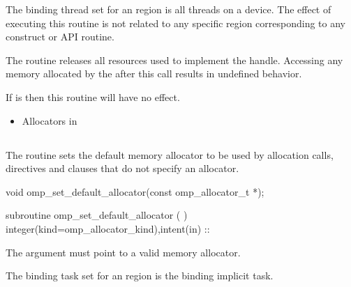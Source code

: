 The binding thread set for an  region is 
all threads on a device. The effect of executing this routine is not 
related to any specific region corresponding to any construct or API routine.

\effect

The  routine releases all resources used 
to implement the  handle. Accessing any memory allocated 
by the  after this call results in undefined behavior.

If  is  then this routine will have no effect.
 
\crossreferences
\begin{itemize}
\item Allocators in 
\end{itemize}



\subsection{}
\label{subsec:omp_set_default_allocator}

\summary
The  routine sets the default memory 
allocator to be used by allocation calls,  directives 
and  clauses that do not specify an allocator.

\format
\begin{ccppspecific}
\begin{ompcFunction}
void omp_set_default_allocator(const omp_allocator_t *);
\end{ompcFunction}
\end{ccppspecific}
\begin{fortranspecific}
\begin{ompfSubroutine}
subroutine omp_set_default_allocator (  )
integer(kind=omp_allocator_kind),intent(in) :: 
\end{ompfSubroutine}
\end{fortranspecific}

\constraints
The  argument must point to a valid memory allocator.

\binding
The binding task set for an  region 
is the binding implicit task.

